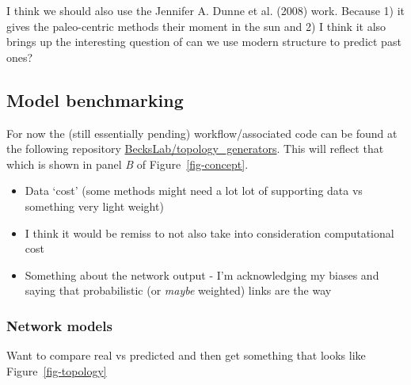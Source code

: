 \documentclass[
  letterpaper,
  DIV=11,
  numbers=noendperiod]{scrartcl}
\providecommand{\tightlist}{%
  \setlength{\itemsep}{0pt}\setlength{\parskip}{0pt}}\usepackage{longtable,booktabs,array}
\begin{document}
I think we should also use the Jennifer A. Dunne et al. (2008) work.
Because 1) it gives the paleo-centric methods their moment in the sun
and 2) I think it also brings up the interesting question of can we use
modern structure to predict past ones?

\subsection{Model benchmarking}\label{sec-model-benchmarking}

For now the (still essentially pending) workflow/associated code can be
found at the following repository
\href{https://github.com/BecksLab/topology_generators}{BecksLab/topology\_generators}.
This will reflect that which is shown in panel \emph{B} of
Figure~\ref{fig-concept}.

\begin{itemize}
\tightlist
\item
  Data `cost' (some methods might need a lot lot of supporting data vs
  something very light weight)
\item
  I think it would be remiss to not also take into consideration
  computational cost
\item
  Something about the network output - I'm acknowledging my biases and
  saying that probabilistic (or \emph{maybe} weighted) links are the way
\end{itemize}

\subsubsection{Network models}\label{network-models}

Want to compare real vs predicted and then get something that looks like
Figure~\ref{fig-topology}
\end{document}
